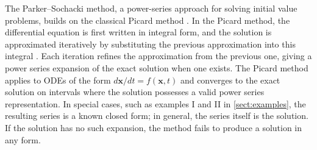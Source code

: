 \documentclass[draft]{agujournal2019}
\begin{document}






The Parker--Sochacki method, a power-series approach for solving initial value problems, builds on the classical Picard method \cite{Parker1996}. In the Picard method, the differential equation is first written in integral form, and the solution is approximated iteratively by substituting the previous approximation into this integral \cite{Boyce2017}. Each iteration refines the approximation from the previous one, giving a power series expansion of the exact solution when one exists. The Picard method applies to ODEs of the form $d\mathbf{x}/dt=f(\mathbf{x},t)$ and converges to the exact solution on intervals where the solution possesses a valid power series representation. In special cases, such as examples I and II in \ref{sect:examples}, the resulting series is a known closed form; in general, the series itself is the solution. If the solution has no such expansion, the method fails to produce a solution in any form.
\end{document}

